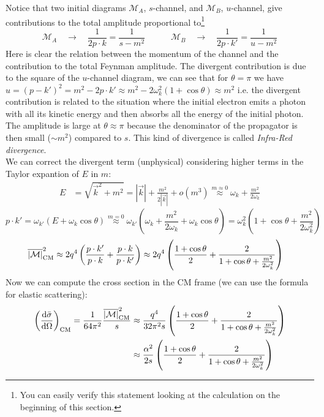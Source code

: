 \documentclass[TheoreticalPhy_ModB.tex]{subfiles}
\begin{document}
Notice that two initial diagrams $\mathcal M_A$, $s$-channel, and $\mathcal M_B$, $u$-channel, give contributions to the total amplitude proportional to\footnote{You can easily verify this statement looking at the calculation on the beginning of this section.} 
\[\mathcal M_A\quad\rightarrow\quad\frac1{2p\cdot k}=\frac1{s-m^2}\qquad\quad
\mathcal M_B\quad\rightarrow\quad\frac1{2p\cdot k'}=\frac1{u-m^2}\]
Here is clear the relation between the momentum of the channel and the contribution to the total Feynman amplitude. The divergent contribution is due to the square of the $u$-channel diagram, we can see that for $\theta=\pi$ we have $u=(p-k')^2=m^2-2p\cdot k'\approx m^2-2\omega_k^2(1+\cos\theta)\approx m^2$ i.e. the divergent contribution is related to the situation where the initial electron emits a photon with all its kinetic energy and then absorbs all the energy of the initial photon. The amplitude is large at $\theta\approx\pi$ because the denominator of the propagator is then small ($\sim m^2$) compared to $s$. This kind of divergence is called \emph{Infra-Red divergence}.\\
We can correct the divergent term (unphysical) considering higher terms in the Taylor expantion of $E$ in $m$:
\begin{align*}
E&=\sqrt{\vec k^2+m^2}=|\vec k|+\frac{m^2}{2|\vec k|}+o(m^3)\overset{m\approx0}{\approx}\omega_k+\frac{m^2}{2\omega_k}
\end{align*}
\[p\cdot k'=\omega_{k'}(E+\omega_k\cos\theta)\overset{m=0}{\approx}\omega_{k'}\left(\omega_k+\frac{m^2}{2\omega_k}+\omega_k\cos\theta\right)
=\omega_{k}^2\left(1+\cos\theta+\frac{m^2}{2\omega_k^2}\right)\]
\begin{align*}
\overline{|\mathcal M|}_{\textup{CM}}^2
&\approx2q^4\left(\frac{p\cdot k'}{p\cdot k}+\frac{p\cdot k}{p\cdot k'}\right)
\approx2q^4\left(\frac{1+\cos\theta}{2}+\frac{2}{1+\cos\theta+\frac{m^2}{2\omega_k^2}}\right)
\end{align*}
Now we can compute the cross section in the CM frame (we can use the formula for elastic scattering):
\begin{align*}
\left(\frac{\textup{d}\bar\sigma}{\textup{d}\Omega}\right)_{\textup{CM}}
=\frac1{64\pi^2}\frac{\overline{|\mathcal M|}^2_{\textup{CM}}}s
&\approx\frac{q^4}{32\pi^2s}\left(\frac{1+\cos\theta}{2}+\frac{2}{1+\cos\theta+\frac{m^2}{2\omega_k^2}}\right)\\
&\approx\frac{\alpha^2}{2s}\left(\frac{1+\cos\theta}{2}+\frac{2}{1+\cos\theta+\frac{m^2}{2\omega_k^2}}\right)
\end{align*}
\end{document}
